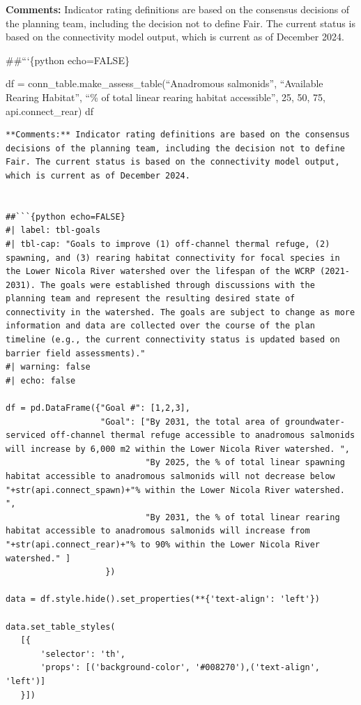\documentclass[
  letterpaper,
  DIV=11,
  numbers=noendperiod]{scrreprt}
\begin{document}
\textbf{Comments:} Indicator rating definitions are based on the
consensus decisions of the planning team, including the decision not to
define Fair. The current status is based on the connectivity model
output, which is current as of December 2024.

\#\#```\{python echo=FALSE\}

df = conn\_table.make\_assess\_table(``Anadromous salmonids'',
``Available Rearing Habitat'', ``\% of total linear rearing habitat
accessible'', 25, 50, 75, api.connect\_rear) df

\begin{verbatim}
**Comments:** Indicator rating definitions are based on the consensus decisions of the planning team, including the decision not to define Fair. The current status is based on the connectivity model output, which is current as of December 2024.


##```{python echo=FALSE}
#| label: tbl-goals
#| tbl-cap: "Goals to improve (1) off-channel thermal refuge, (2) spawning, and (3) rearing habitat connectivity for focal species in the Lower Nicola River watershed over the lifespan of the WCRP (2021-2031). The goals were established through discussions with the planning team and represent the resulting desired state of connectivity in the watershed. The goals are subject to change as more information and data are collected over the course of the plan timeline (e.g., the current connectivity status is updated based on barrier field assessments)."
#| warning: false
#| echo: false

df = pd.DataFrame({"Goal #": [1,2,3],
                   "Goal": ["By 2031, the total area of groundwater-serviced off-channel thermal refuge accessible to anadromous salmonids will increase by 6,000 m2 within the Lower Nicola River watershed. ",
                            "By 2025, the % of total linear spawning habitat accessible to anadromous salmonids will not decrease below "+str(api.connect_spawn)+"% within the Lower Nicola River watershed.  ",
                            "By 2031, the % of total linear rearing habitat accessible to anadromous salmonids will increase from "+str(api.connect_rear)+"% to 90% within the Lower Nicola River watershed." ]
                    })

data = df.style.hide().set_properties(**{'text-align': 'left'})

data.set_table_styles(
   [{
       'selector': 'th',
       'props': [('background-color', '#008270'),('text-align', 'left')]
   }])
\end{verbatim}
\end{document}
